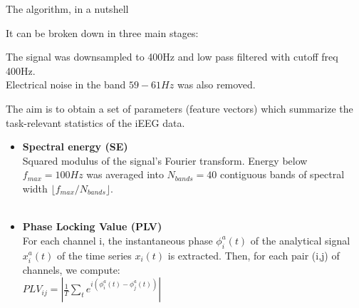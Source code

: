 \documentclass[final,t,overlay, xcolor=table, sans, mathserif]{beamer}
\begin{document}
\begin{frame}{}
\begin{columns}[t]
\begin{column}{.33\linewidth}
\begin{block}{The algorithm, in a nutshell}

\begin{center}
It can be broken down in three main stages: \\
\vspace{1cm}
\end{center}

\centering
\begin{minipage}[t]{0.95\linewidth}
\begin{tcolorbox}[title=1. Preprocessing]
The signal was downsampled to 400Hz and low pass filtered with cutoff freq 400Hz. \\
Electrical noise in the band $59-61Hz$ was also removed.
\end{tcolorbox}
\end{minipage}

\begin{minipage}[t]{0.95\linewidth}
\begin{tcolorbox}[title=2. Feature extraction]
The aim is to obtain a set of parameters (feature vectors) which summarize the task-relevant statistics of the iEEG data.
\qquad \\

\begin{itemize}
\item {\bf Spectral energy (SE)} \\
Squared modulus of the signal's Fourier transform. Energy below $f_{max}=100Hz$ was averaged into $N_{bands}=40$ contiguous
bands of spectral width $\lfloor f_{max}/N_{bands}\rfloor$. \\
\qquad \\

\item {\bf Phase Locking Value (PLV)} \\
For each channel i, the instantaneous phase $\phi_{i}^{a}(t)$ of the analytical signal $x_{i}^{a}(t)$
of the time series $x_{i}(t)$ is extracted. Then, for each pair (i,j) of channels,
we compute: \\
$PLV_{ij}=\left|\frac{1}{T}\sum_{t}e^{i(\phi_{i}^{a}(t)-\phi_{j}^{a}(t))}\right|$ \\
\qquad \\


\end{itemize}
\end{tcolorbox}
\end{minipage}
\end{block}
\end{column}
\end{columns}
\end{frame}
\end{document}
